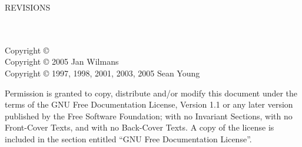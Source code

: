 \begingroup
	{\WorkInProgressFullScreen}

	\vspace*{\fill} %

	{\Large\textbf{\BookTitle}}

	\vspace*{0.1cm}

	{\large\AuthorNameSurname}

	\LatestRevisionName{}

	REVISIONS\\
	\LatestRevisionDate{}\\
	\RevisionTwoDate{}\\
	\RevisionOneDate{}

	\vspace*{0.2cm}

	Copyright {\copyright} \LatestYear{} \AuthorNameSurname{}\\	%
	Copyright {\copyright} 2005 Jan Wilmans\\
	Copyright {\copyright} 1997, 1998, 2001, 2003, 2005 Sean Young

	Permission is granted to copy, distribute and/or modify this document under the terms of the GNU Free Documentation License, Version 1.1 or any later version published by the Free Software Foundation; with no Invariant Sections, with no Front-Cover Texts, and with no Back-Cover Texts. A copy of the license is included in the section entitled ``GNU Free Documentation License''.
\endgroup
